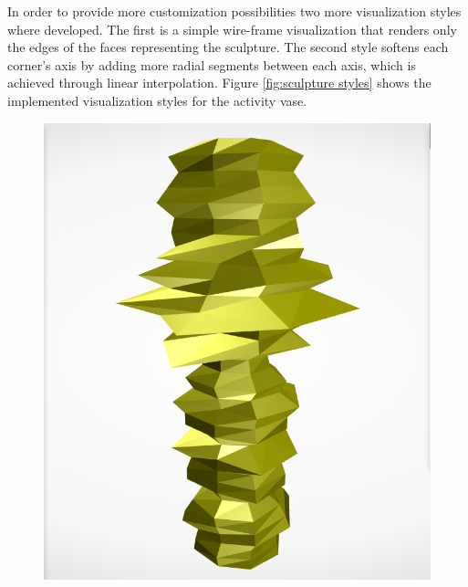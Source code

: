 \documentclass[../medieninformatik-arbeit.tex]{subfiles}
\begin{document}
In order to provide more customization possibilities two more visualization styles where developed. The first is a simple wire-frame visualization that renders only the edges of the faces representing the sculpture. The second style softens each corner's axis by adding more radial segments between each axis, which is achieved through linear interpolation. Figure \ref{fig:sculpture styles} shows the implemented visualization styles for the activity vase. 

\begin{figure}[t!]
\centering
\begin{minipage}{.225\textwidth}
\centering
\includegraphics[width=\linewidth]{Configurator/img/sculpture-1}
\end{minipage}
\begin{minipage}{.225\textwidth}
\centering

\end{minipage}
\end{figure}
\end{document}
